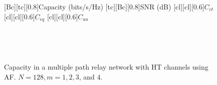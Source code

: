 \begin{figure}
    [Bc][tc][0.8]{Capacity (bits/s/Hz)}
    [tc][Bc][0.8]{SNR (dB)}
    [cl][cl][0.6]{$C_{ct}$}
    [cl][cl][0.6]{$C_{eq}$}
    [cl][cl][0.6]{$C_{aa}$}
\centerline{
	 \\
}
\centerline{
	 \\
}
\caption{Capacity in a multiple path relay network with HT channels using AF.  $N = 128, m = 1, 2, 3$, and $4$.}
\label{fig:mp_af_cap_plots_HT}
\end{figure}


